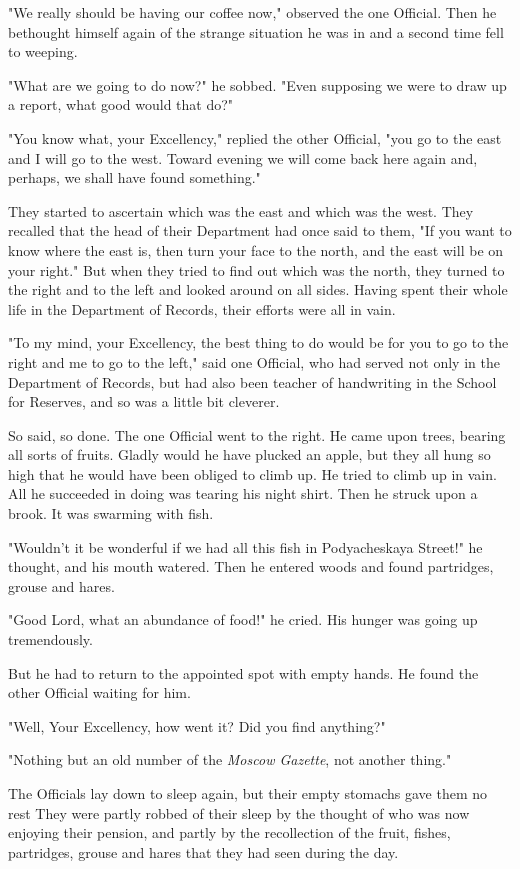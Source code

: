 "We really should be having our coffee now," observed the one
Official. Then he bethought himself again of the strange situation he
was in and a second time fell to weeping.

"What are we going to do now?" he sobbed. "Even supposing we were to
draw up a report, what good would that do?"

"You know what, your Excellency," replied the other Official, "you go
to the east and I will go to the west. Toward evening we will come
back here again and, perhaps, we shall have found something."

They started to ascertain which was the east and which was the west.
They recalled that the head of their Department had once said to them,
"If you want to know where the east is, then turn your face to the
north, and the east will be on your right." But when they tried to
find out which was the north, they turned to the right and to the left
and looked around on all sides. Having spent their whole life in the
Department of Records, their efforts were all in vain.

"To my mind, your Excellency, the best thing to do would be for you to
go to the right and me to go to the left," said one Official, who had
served not only in the Department of Records, but had also been
teacher of handwriting in the School for Reserves, and so was a little
bit cleverer.

So said, so done. The one Official went to the right. He came upon
trees, bearing all sorts of fruits. Gladly would he have plucked an
apple, but they all hung so high that he would have been obliged to
climb up. He tried to climb up in vain. All he succeeded in doing was
tearing his night shirt. Then he struck upon a brook. It was swarming
with fish.

"Wouldn't it be wonderful if we had all this fish in Podyacheskaya
Street!" he thought, and his mouth watered. Then he entered woods and
found partridges, grouse and hares.

"Good Lord, what an abundance of food!" he cried. His hunger was going
up tremendously.

But he had to return to the appointed spot with empty hands. He found
the other Official waiting for him.

"Well, Your Excellency, how went it? Did you find anything?"

"Nothing but an old number of the \emph{Moscow Gazette}, not another
thing."

The Officials lay down to sleep again, but their empty stomachs gave
them no rest They were partly robbed of their sleep by the thought of
who was now enjoying their pension, and partly by the recollection of
the fruit, fishes, partridges, grouse and hares that they had seen
during the day.

